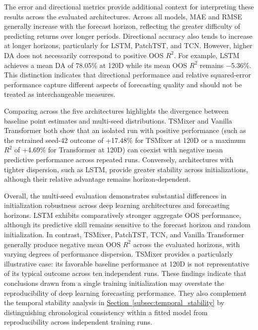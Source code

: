 \documentclass[runningheads,orivec]{llncs}
\begin{document}
The error and directional metrics provide additional context for interpreting these results across the evaluated architectures. Across all models, MAE and RMSE generally increase with the forecast horizon, reflecting the greater difficulty of predicting returns over longer periods. Directional accuracy also tends to increase at longer horizons, particularly for LSTM, PatchTST, and TCN. However, higher DA does not necessarily correspond to positive OOS $R^2$. For example, LSTM achieves a mean DA of 78.05\% at 120D while its mean OOS $R^2$ remains $-$5.36\%. This distinction indicates that directional performance and relative squared-error performance capture different aspects of forecasting quality and should not be treated as interchangeable measures.

Comparing across the five architectures highlights the divergence between baseline point estimates and multi-seed distributions. TSMixer and Vanilla Transformer both show that an isolated run with positive performance (such as the retrained seed-42 outcome of +17.48\% for TSMixer at 120D or a maximum $R^2$ of +4.69\% for Transformer at 120D) can coexist with negative mean predictive performance across repeated runs. Conversely, architectures with tighter dispersion, such as LSTM, provide greater stability across initializations, although their relative advantage remains horizon-dependent.

Overall, the multi-seed evaluation demonstrates substantial differences in initialization robustness across deep learning architectures and forecasting horizons. LSTM exhibits comparatively stronger aggregate OOS performance, although its predictive skill remains sensitive to the forecast horizon and random initialization. In contrast, TSMixer, PatchTST, TCN, and Vanilla Transformer generally produce negative mean OOS $R^2$ across the evaluated horizons, with varying degrees of performance dispersion. TSMixer provides a particularly illustrative case: its favorable baseline performance at 120D is not representative of its typical outcome across ten independent runs. These findings indicate that conclusions drawn from a single training initialization may overstate the reproducibility of deep learning forecasting performance. They also complement the temporal stability analysis in \hyperref[subsec:temporal_stability]{Section~\ref*{subsec:temporal_stability}} by distinguishing chronological consistency within a fitted model from reproducibility across independent training runs.
\end{document}
